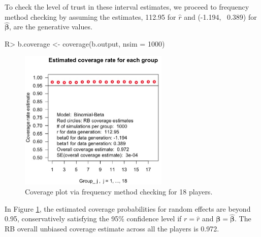 \documentclass[article]{jss}
\begin{document}
To check the level of trust in these interval estimates, we  proceed to frequency method checking by assuming the estimates, 112.95 for $\hat{r}$ and (-1.194, ~0.389) for $\hat{\boldsymbol{\beta}}$, are the generative values. 

\begin{CodeChunk}
\begin{CodeInput}
R> b.coverage <- coverage(b.output, nsim = 1000) 
\end{CodeInput}
\end{CodeChunk}
\begin{figure}[h!]
\begin{center}
\includegraphics[width = 2.8in]{baseball2.png}
\caption{Coverage plot via frequency method checking for 18 players.}
\label{fig:baseball2}
\end{center}
\end{figure}



In Figure \ref{fig:baseball2},  the estimated coverage probabilities for random effects are beyond 0.95, conservatively satisfying the 95\% confidence level if $r=\hat{r}$ and $\boldsymbol{\beta}=\hat{\boldsymbol{\beta}}$. The RB overall unbiased coverage estimate across all the players is 0.972. %
\end{document}

